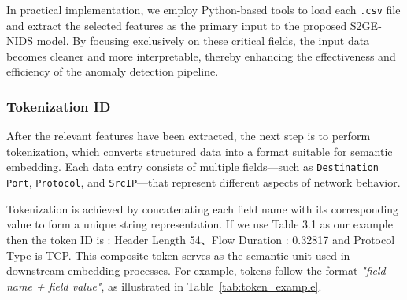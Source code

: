 \begin{ZhChapter}
In practical implementation, we employ Python-based tools to load each \texttt{.csv} file and extract the selected features as the primary input to the proposed S2GE-NIDS model. By focusing exclusively on these critical fields, the input data becomes cleaner and more interpretable, thereby enhancing the effectiveness and efficiency of the anomaly detection pipeline.


\subsubsection{Tokenization ID}
After the relevant features have been extracted, the next step is to perform tokenization, which converts structured data into a format suitable for semantic embedding. Each data entry consists of multiple fields—such as \texttt{Destination Port}, \texttt{Protocol}, and \texttt{SrcIP}—that represent different aspects of network behavior.

Tokenization is achieved by concatenating each field name with its corresponding value to form a unique string representation. If we use Table 3.1 as our example then the token ID is : Header Length 54、Flow Duration : 0.32817  and Protocol Type is TCP. This composite token serves as the semantic unit used in downstream embedding processes. For example, tokens follow the format \textit{"field name + field value"}, as illustrated in Table~\ref{tab:token_example}.


\begin{table}[htbp]
    \centering
    \caption{Example of Tokenized Input Fields} \label{tab:token_example}
\end{table}




\end{ZhChapter}
